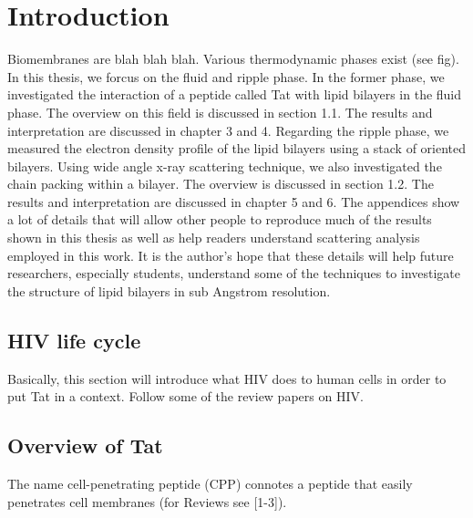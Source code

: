 \chapter{Introduction}
Biomembranes are blah blah blah. Various thermodynamic phases exist (see fig).
In this thesis, we forcus on the fluid and ripple phase. In the former phase,
we investigated the interaction of a peptide called Tat with lipid bilayers
in the fluid phase. The overview on this field is discussed in section 1.1.
The results and interpretation are discussed in chapter 3 and 4. Regarding
the ripple phase, we measured the electron density profile of the lipid
bilayers using a stack of oriented bilayers. Using wide angle x-ray scattering
technique, we also investigated the chain packing within a bilayer. The 
overview is discussed in section 1.2. The results and interpretation are 
discussed in chapter 5 and 6. The appendices show a lot of details that will
allow other people to reproduce much of the results shown in this thesis 
as well as help readers understand scattering analysis employed in this work.
It is the author's hope that these details will help future researchers,
especially students, understand some of the techniques to investigate the
structure of lipid bilayers in sub Angstrom resolution.

\section{HIV life cycle}
Basically, this section will introduce what HIV does to human cells in order
to put Tat in a context. Follow some of the review papers on HIV.

\section{Overview of Tat}
The name cell-penetrating peptide (CPP) connotes a peptide that 
easily penetrates cell membranes (for Reviews see [1-3]). 

